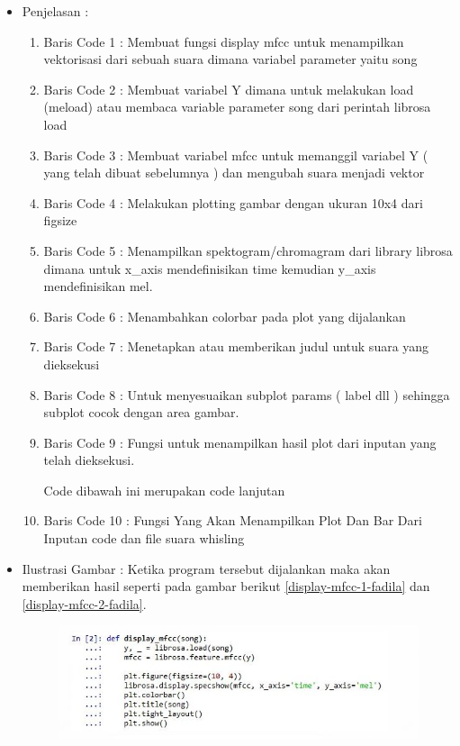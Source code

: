 \begin{enumerate}
\begin{itemize}
\item Penjelasan :
\par
\begin{enumerate}
\item Baris Code 1 : Membuat fungsi display mfcc untuk menampilkan vektorisasi dari sebuah suara dimana variabel parameter yaitu song
\item Baris Code 2 : Membuat variabel Y dimana untuk melakukan load (meload) atau membaca variable parameter song dari perintah librosa load
\item Baris Code 3 : Membuat variabel mfcc untuk memanggil variabel Y ( yang telah dibuat sebelumnya ) dan mengubah suara menjadi vektor
\item Baris Code 4 : Melakukan plotting gambar dengan ukuran 10x4 dari figsize
\item Baris Code 5 : Menampilkan spektogram/chromagram dari library librosa dimana untuk x\_axis mendefinisikan time kemudian y\_axis mendefinisikan mel.
\item Baris Code 6 : Menambahkan colorbar pada plot yang dijalankan
\item Baris Code 7 : Menetapkan atau memberikan judul untuk suara yang dieksekusi
\item Baris Code 8 : Untuk menyesuaikan subplot params ( label dll ) sehingga subplot cocok dengan area gambar.
\item Baris Code 9 : Fungsi untuk menampilkan hasil plot dari inputan yang telah dieksekusi.
\par Code dibawah ini merupakan code lanjutan
\item Baris Code 10 : Fungsi Yang Akan Menampilkan Plot Dan Bar Dari Inputan code dan file suara whisling
\end{enumerate}
\par
\item Ilustrasi Gambar : Ketika program tersebut dijalankan maka akan memberikan hasil seperti pada gambar berikut \ref {display-mfcc-1-fadila} dan \ref{display-mfcc-2-fadila}.
\par
\begin{figure}[!hbtp]
\centering
\includegraphics[scale=0.2]{figures/display-mfcc-1-fadila.jpg}

\end{figure}
\end{itemize}
\end{enumerate}
